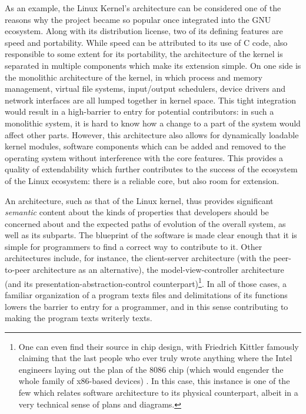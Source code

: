 As an example, the Linux Kernel's architecture can be considered one of the reasons why the project became so popular once integrated into the GNU ecosystem. Along with its distribution license, two of its defining features are speed and portability. While speed can be attributed to its use of C code, also responsible to some extent for its portability, the architecture of the kernel is separated in multiple components which make its extension simple. On one side is the monolithic architecture of the kernel, in which process and memory management, virtual file systems, input/output schedulers, device drivers and network interfaces are all lumped together in kernel space. This tight integration would result in a high-barrier to entry for potential contributors: in such a monolithic system, it is hard to know how a change to a part of the system would affect other parts. However, this architecture also allows for dynamically loadable kernel modules, software components which can be added and removed to the operating system without interference with the core features. This provides a quality of extendability which further contributes to the success of the ecosystem of the Linux ecosystem: there is a reliable core, but also room for extension.

An architecture, such as that of the Linux kernel, thus provides significant \emph{semantic} content about the kinds of properties that developers should be concerned about and the expected paths of evolution of the overall system, as well as its subparts. The blueprint of the software is made clear enough that it is simple for programmers to find a correct way to contribute to it. Other architectures include, for instance, the client-server architecture (with the peer-to-peer architecture as an alternative), the model-view-controller architecture (and its presentation-abstraction-control counterpart)\footnote{One can even find their source in chip design, with Friedrich Kittler famously claiming that the last people who ever truly wrote anything where the Intel engineers laying out the plan of the 8086 chip (which would engender the whole family of x86-based devices) \citep{kittler_there_1997}. In this case, this instance is one of the few which relates software architecture to its physical counterpart, albeit in a very technical sense of plans and diagrams.}. In all of those cases, a familiar organization of a program texts files and delimitations of its functions lowers the barrier to entry for a programmer, and in this sense contributing to making the program texts writerly texts.

